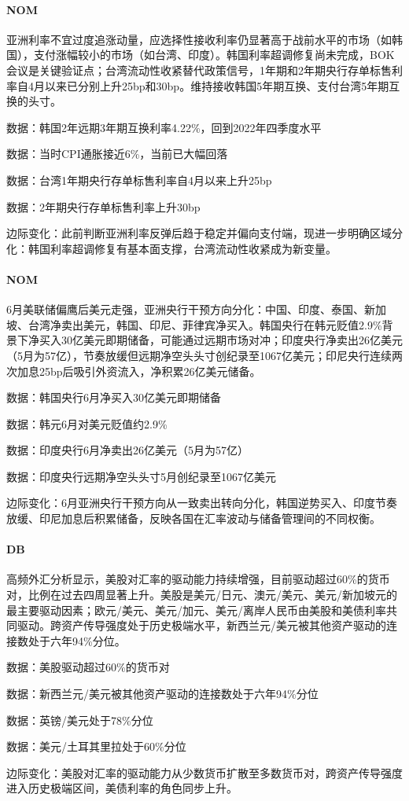 \documentclass[11pt]{ctexart}
\begin{document}
\paragraph{NOM} 亚洲利率不宜过度追涨动量，应选择性接收利率仍显著高于战前水平的市场（如韩国），支付涨幅较小的市场（如台湾、印度）。韩国利率超调修复尚未完成，BOK会议是关键验证点；台湾流动性收紧替代政策信号，1年期和2年期央行存单标售利率自4月以来已分别上升25bp和30bp。维持接收韩国5年期互换、支付台湾5年期互换的头寸。
{\small\color{refgray}数据：韩国2年远期3年期互换利率4.22\%，回到2022年四季度水平\par}
{\small\color{refgray}数据：当时CPI通胀接近6\%，当前已大幅回落\par}
{\small\color{refgray}数据：台湾1年期央行存单标售利率自4月以来上升25bp\par}
{\small\color{refgray}数据：2年期央行存单标售利率上升30bp\par}
{\small\color{refgray}边际变化：此前判断亚洲利率反弹后趋于稳定并偏向支付端，现进一步明确区域分化：韩国利率超调修复有基本面支撑，台湾流动性收紧成为新变量。\par}
\paragraph{NOM} 6月美联储偏鹰后美元走强，亚洲央行干预方向分化：中国、印度、泰国、新加坡、台湾净卖出美元，韩国、印尼、菲律宾净买入。韩国央行在韩元贬值2.9\%背景下净买入30亿美元即期储备，可能通过远期市场对冲；印度央行净卖出26亿美元（5月为57亿），节奏放缓但远期净空头头寸创纪录至1067亿美元；印尼央行连续两次加息25bp后吸引外资流入，净积累26亿美元储备。
{\small\color{refgray}数据：韩国央行6月净买入30亿美元即期储备\par}
{\small\color{refgray}数据：韩元6月对美元贬值约2.9\%\par}
{\small\color{refgray}数据：印度央行6月净卖出26亿美元（5月为57亿）\par}
{\small\color{refgray}数据：印度央行远期净空头头寸5月创纪录至1067亿美元\par}
{\small\color{refgray}边际变化：6月亚洲央行干预方向从一致卖出转向分化，韩国逆势买入、印度节奏放缓、印尼加息后积累储备，反映各国在汇率波动与储备管理间的不同权衡。\par}
\paragraph{DB} 高频外汇分析显示，美股对汇率的驱动能力持续增强，目前驱动超过60\%的货币对，比例在过去四周显著上升。美股是美元/日元、澳元/美元、美元/新加坡元的最主要驱动因素；欧元/美元、美元/加元、美元/离岸人民币由美股和美债利率共同驱动。跨资产传导强度处于历史极端水平，新西兰元/美元被其他资产驱动的连接数处于六年94\%分位。
{\small\color{refgray}数据：美股驱动超过60\%的货币对\par}
{\small\color{refgray}数据：新西兰元/美元被其他资产驱动的连接数处于六年94\%分位\par}
{\small\color{refgray}数据：英镑/美元处于78\%分位\par}
{\small\color{refgray}数据：美元/土耳其里拉处于60\%分位\par}
{\small\color{refgray}边际变化：美股对汇率的驱动能力从少数货币扩散至多数货币对，跨资产传导强度进入历史极端区间，美债利率的角色同步上升。\par}
\end{document}
